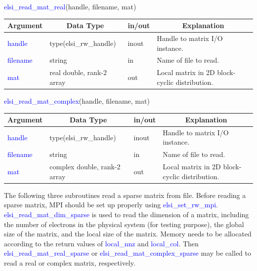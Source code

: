\documentclass{report}
\begin{document}
\bigskip
\begin{labeling}{\hspace{6cm}}
\item [\hspace{0.3cm} \textcolor{blue}{elsi\_read\_mat\_real}(handle, filename, mat)]
\end{labeling}

\begin{tabular}[]{|p{20mm}|p{45mm}|p{15mm}|p{85mm}|}
\hline
\multicolumn{1}{|c|}{\textbf{Argument}} & \multicolumn{1}{c|}{\textbf{Data Type}} & \multicolumn{1}{c|}{\textbf{in/out}} & \multicolumn{1}{c|}{\textbf{Explanation}}\\
\hline
\textcolor{blue}{handle}   & type(elsi\_rw\_handle)    & inout & Handle to matrix I/O instance.\\
\hline
\textcolor{blue}{filename} & string                    & in    & Name of file to read.\\
\hline
\textcolor{blue}{mat}      & real double, rank-2 array & out   & Local matrix in 2D block-cyclic distribution.\\
\hline
\end{tabular}

\bigskip
\begin{labeling}{\hspace{6cm}}
\item [\hspace{0.3cm} \textcolor{blue}{elsi\_read\_mat\_complex}(handle, filename, mat)]
\end{labeling}

\begin{tabular}[]{|p{20mm}|p{45mm}|p{15mm}|p{85mm}|}
\hline
\multicolumn{1}{|c|}{\textbf{Argument}} & \multicolumn{1}{c|}{\textbf{Data Type}} & \multicolumn{1}{c|}{\textbf{in/out}} & \multicolumn{1}{c|}{\textbf{Explanation}}\\
\hline
\textcolor{blue}{handle}   & type(elsi\_rw\_handle)       & inout & Handle to matrix I/O instance.\\
\hline
\textcolor{blue}{filename} & string                       & in    & Name of file to read.\\
\hline
\textcolor{blue}{mat}      & complex double, rank-2 array & out   & Local matrix in 2D block-cyclic distribution.\\
\hline
\end{tabular}

\bigskip
The following three subroutines read a sparse matrix from file.  Before reading a sparse matrix, MPI should be set up properly using \textcolor{blue}{elsi\_set\_rw\_mpi}.  \textcolor{blue}{elsi\_read\_mat\_dim\_sparse} is used to read the dimension of a matrix, including the number of electrons in the physical system (for testing purpose), the global size of the matrix, and the local size of the matrix.  Memory needs to be allocated according to the return values of \textcolor{blue}{local\_nnz} and \textcolor{blue}{local\_col}.  Then \textcolor{blue}{elsi\_read\_mat\_real\_sparse} or \textcolor{blue}{elsi\_read\_mat\_complex\_sparse} may be called to read a real or complex matrix, respectively.\\
\end{document}
